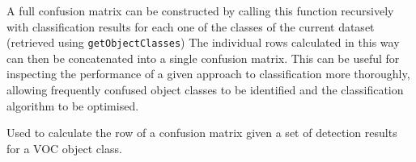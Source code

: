 A full confusion matrix can be constructed by calling this function recursively with classification results for each one of the classes of the current dataset (retrieved using \texttt{getObjectClasses}) The individual rows calculated in this way can then be concatenated into a single confusion matrix. This can be useful for inspecting the performance of a given approach to classification more thoroughly, allowing frequently confused object classes to be identified and the classification algorithm to be optimised.


Used to calculate the row of a confusion matrix given a set of detection results for a VOC object class.

